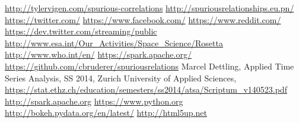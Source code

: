 \documentclass[12pt, a4paper]{article}
\begin{document}
\begin{thebibliography}{9}

\url{http://tylervigen.com/spurious-correlations}
\url{http://spuriousrelationships.eu.pn/}
\url{https://twitter.com/}
\url{https://www.facebook.com/}
\url{https://www.reddit.com/}
\url{https://dev.twitter.com/streaming/public}
\url{http://www.esa.int/Our_Activities/Space_Science/Rosetta}
\url{http://www.who.int/en/}
\url{https://spark.apache.org/}
\url{https://github.com/cbruderer/spuriousrelations}
 Marcel Dettling, Applied Time Series Analysis, SS 2014, Zurich University of Applied Sciences, \url{https://stat.ethz.ch/education/semesters/ss2014/atsa/Scriptum_v140523.pdf}
\url{http://spark.apache.org}
\url{https://www.python.org}
\url{http://bokeh.pydata.org/en/latest/}
\url{http://html5up.net}

\end{thebibliography}
\end{document}

